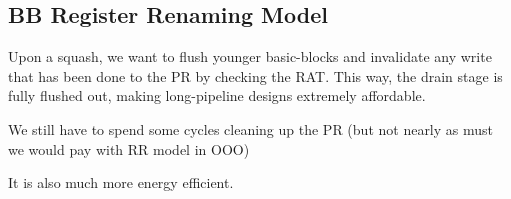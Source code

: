 \subsection{BB Register Renaming Model}
\label{sec:bb_reg_ren}

Upon a squash, we want to flush younger basic-blocks and invalidate any write
that has been done to the PR by checking the RAT. This way, the drain stage is
fully flushed out, making long-pipeline designs extremely affordable.

We still have to spend some cycles cleaning up the PR (but not nearly as must we
        would pay with RR model in OOO)

It is also much more energy efficient.
